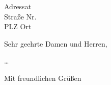 \documentclass[
	fsphys,
	a4paper,
	11pt,
	german, ngerman
]{scrlttr2}
\begin{document}
\begin{letter}{Adressat\\Straße Nr.\\PLZ Ort}

\opening{Sehr geehrte Damen und Herren,}

…

\closing{Mit freundlichen Grüßen}




\end{letter}
\end{document}
